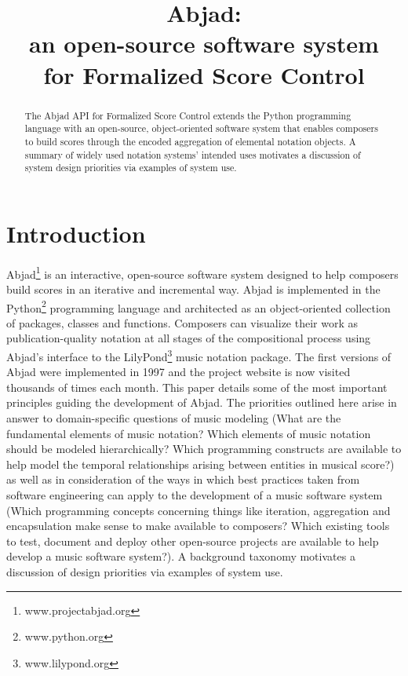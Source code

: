 \documentclass{article}
\title{Abjad: \\
an open-source software system \\
for Formalized Score Control}
\begin{document}
\capstartfalse
\maketitle
\capstarttrue

\begin{abstract}
The Abjad API for Formalized Score Control extends the Python programming
language with an open-source, object-oriented software system that enables
composers to build scores through the encoded aggregation of elemental notation
objects. A summary of widely used notation systems' intended uses motivates a
discussion of system design priorities via examples of system use.
\end{abstract}
\section{Introduction} \label{sec:introduction}

Abjad\footnote{www.projectabjad.org} is an interactive, open-source software
system designed to help composers build scores in an iterative and incremental
way.  Abjad is implemented in the Python\footnote{www.python.org} programming
language and architected as an object-oriented collection of packages, classes
and functions. Composers can visualize their work as publication-quality
notation at all stages of the compositional process using Abjad's interface to
the LilyPond\footnote{www.lilypond.org} music notation package. The first
versions of Abjad were implemented in 1997 and the project website is now
visited thousands of times each month. This paper details some of the most
important principles guiding the development of Abjad. The priorities outlined
here arise in answer to domain-specific questions of music modeling (What are
the fundamental elements of music notation? Which elements of music notation
should be modeled hierarchically? Which programming constructs are available to
help model the temporal relationships arising between entities in musical
score?) as well as in consideration of the ways in which best practices taken
from software engineering can apply to the development of a music software
system (Which programming concepts concerning things like iteration,
aggregation and encapsulation make sense to make available to composers? Which
existing tools to test, document and deploy other open-source projects are
available to help develop a music software system?). A background taxonomy motivates a discussion of design priorities via examples of system use.
\end{document}
